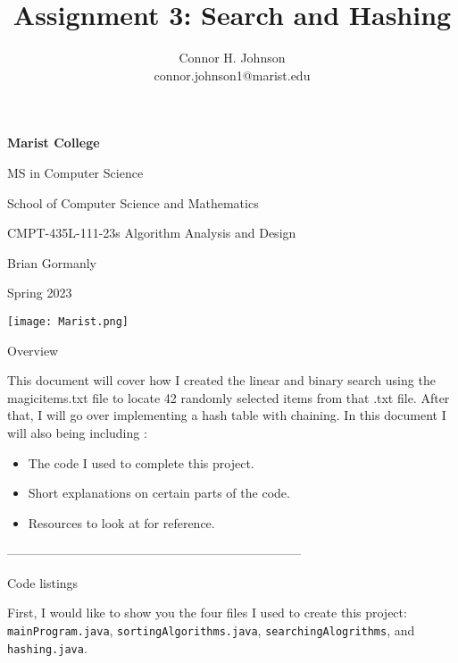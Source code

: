 \documentclass{article}
\title{Assignment 3: Search and Hashing }
\author{Connor H. Johnson \\ connor.johnson1@marist.edu}
\begin{document}
\begin{center} \vfill
\textbf{\Large Marist College}

{\large MS in Computer Science

School of Computer Science and Mathematics \vfill

CMPT-435L-111-23s Algorithm Analysis and Design 

Brian Gormanly

Spring 2023 

\vfill
\texttt{[image: Marist.png]} \vfill

\emph{\Large\thetitle} \vfill 
\theauthor} \vfill

\end{center} \clearpage
\maketitle

\begin{center}
\begin{large}
    Overview
\end{large}    
\end{center}

\begin{center} \noindent
This document will cover how I created the linear and binary search using the magicitems.txt file to locate 42 randomly selected items from that .txt file. After that, I will go over implementing a hash table with chaining. In this document I will also being including :
\begin{itemize}
\item The code I used to complete this project.
\item Short explanations on certain parts of the code.
\item Resources to look at for reference.

\end{itemize}
\end{center}

\begin{center}
    -----------------------------------------------------------------------
\end{center}

\begin{center}
\begin{large}
    Code listings
\end{large}
\end{center}


First, I would like to show you the four files I used to create this project: \verb|mainProgram.java|, \verb|sortingAlgorithms.java|, \verb|searchingAlogrithms|, and \verb|hashing.java|. 
\end{document}
